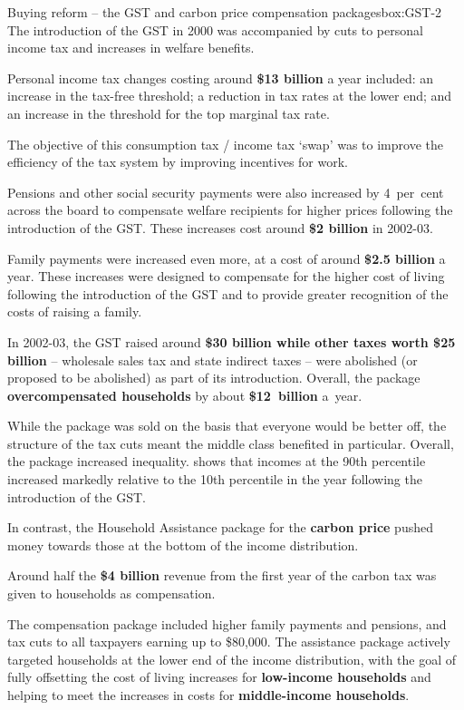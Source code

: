 \documentclass{grattanAlpha}
\begin{document}
\begin{bigboxC*}{Buying reform -- the GST and carbon price compensation packages}{box:GST-2}
The introduction of the GST in 2000 was accompanied by cuts to personal income tax and increases in welfare benefits.

Personal income tax changes costing around \textbf{\$13 billion} a year included: an increase in the tax-free threshold; a reduction in tax rates at the lower end; and an increase in the threshold for the top marginal tax rate. 

The objective of this consumption tax / income tax ‘swap’ was to improve the efficiency of the tax system by improving incentives for work.

Pensions and other social security payments were also increased by 4~per~cent across the board to compensate welfare recipients for higher prices following the introduction of the GST. These increases cost around \textbf{\$2 billion} in 2002-03. 

Family payments were increased even more, at a cost of around \textbf{\$2.5 billion} a year. These increases were designed to compensate for the higher cost of living following the introduction of the GST and to provide greater recognition of the costs of raising a family. 

In 2002-03, the GST raised around \textbf{\$30 billion while other taxes worth \$25 billion} – wholesale sales tax and state indirect taxes – were abolished (or proposed to be abolished) as part of its introduction. Overall, the package \textbf{overcompensated households} by about \textbf{\$12~billion} a~year.

While the package was sold on the basis that everyone would be better off, the structure of the tax cuts meant the middle class benefited in particular. Overall, the package increased inequality. \textcite{Saunders2004} shows that incomes at the 90th percentile increased markedly relative to the 10th percentile in the year following the introduction of the GST.

In contrast, the Household Assistance package for the \textbf{carbon price} pushed money towards those at the bottom of the income distribution. 

Around half the \textbf{\$4 billion} revenue from the first year of the carbon tax was given to households as compensation.  

The compensation package included higher family payments and pensions, and tax cuts to all taxpayers earning up to \$80,000. The assistance package actively targeted households at the lower end of the income distribution, with the goal of fully offsetting the cost of living increases for \textbf{low-income households} and helping to meet the increases in costs for \textbf{middle-income households}. 


\end{bigboxC*}
\end{document}
